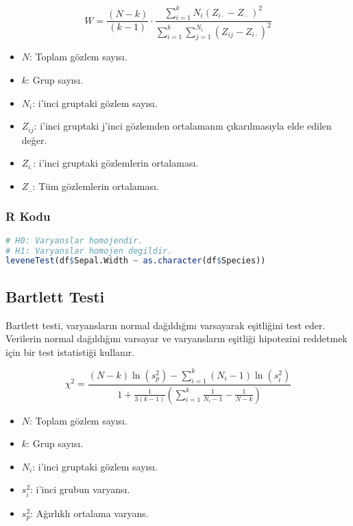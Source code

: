 \[
W = \frac{(N - k)}{(k - 1)} \cdot \frac{\sum_{i=1}^{k} N_i (Z_{i \cdot} - Z_{\cdot \cdot})^2}{\sum_{i=1}^{k} \sum_{j=1}^{N_i} (Z_{ij} - Z_{i \cdot})^2}
\]

\begin{itemize}
	\item $N$: Toplam gözlem sayısı.
	\item $k$: Grup sayısı.
	\item $N_i$: i'inci gruptaki gözlem sayısı.
	\item $Z_{ij}$: i'inci gruptaki j'inci gözlemden ortalamanın çıkarılmasıyla elde edilen değer.
	\item $Z_{i.}$: i'inci gruptaki gözlemlerin ortalaması.
	\item $Z_{..}$: Tüm gözlemlerin ortalaması.
\end{itemize}

\subsubsection{R Kodu}

\begin{lstlisting}[language=R]
# H0: Varyanslar homojendir.
# H1: Varyanslar homojen degildir.
leveneTest(df$Sepal.Width ~ as.character(df$Species))
\end{lstlisting}

\newpage

\subsection{Bartlett Testi}
Bartlett testi, varyansların normal dağıldığını varsayarak eşitliğini test eder. Verilerin normal dağıldığını varsayar ve varyansların eşitliği hipotezini reddetmek için bir test istatistiği kullanır.

\[
\chi^2 = \frac{(N - k) \ln(s_p^2) - \sum_{i=1}^{k} (N_i - 1) \ln(s_i^2)}{1 + \frac{1}{3(k-1)} \left( \sum_{i=1}^{k} \frac{1}{N_i - 1} - \frac{1}{N - k} \right)}
\]

\begin{itemize}
	\item $N$: Toplam gözlem sayısı.
	\item $k$: Grup sayısı.
	\item $N_i$: i'inci gruptaki gözlem sayısı.
	\item $s_i^2$: i'inci grubun varyansı.
	\item $s_p^2$: Ağırlıklı ortalama varyans.
\end{itemize}

